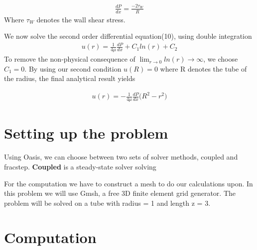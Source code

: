 \documentclass[a4paper,norsk]{article}
\begin{document}
\begin{align}
\frac{d P}{d x} = \frac{-2 \tau_W}{R}
\end{align}
Where $\tau_W$ denotes the wall shear stress.

We now solve the second order differential equation(10), using double integration
\begin{align}
u(r) = \frac{1}{4 \mu} \frac{dP}{dx} + C_1 ln(r) + C_2
\end{align}
To remove the non-physical consequence of $\lim_{r \to 0} ln(r) \rightarrow \infty$, we choose $C_1 = 0$. By using our
second condition $u(R) = 0$ where R denotes the tube of the radius, the final analytical result yields

\begin{align}
u(r) = - \frac{1}{4 \mu}\frac{d P}{d x} \big(R^2 -  r^2 \big)
\end{align}

\section*{Setting up the problem}
Using Oasis, we can choose between two sets of solver methods, coupled and fracstep. \textbf{Coupled} is a steady-state
solver solving


For the computation we have to construct a mesh to do our calculations upon. In this problem we will use
Gmsh, a free 3D finite element grid generator. The problem will be solved on a tube with radius = 1 and length
z = 3.


\section{Computation}
\end{document}
